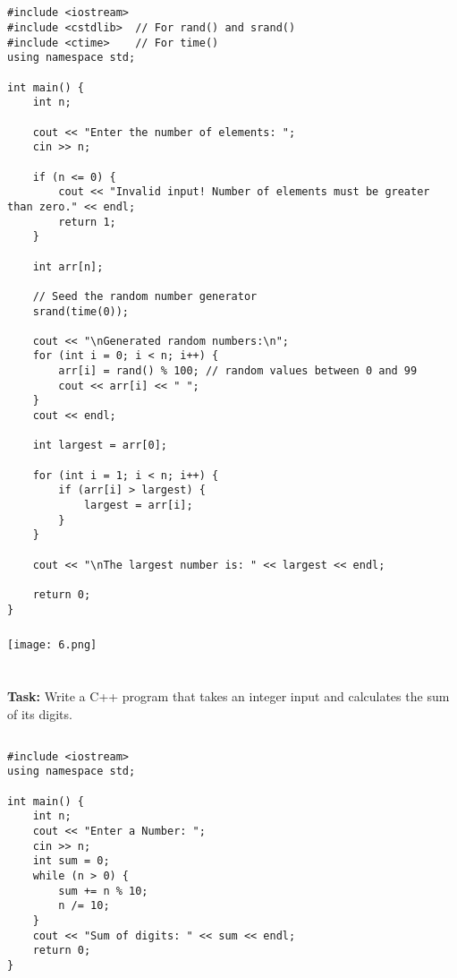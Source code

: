 \documentclass[12pt,a4paper]{article}
\begin{document}
\subsection{}
\begin{lstlisting}
#include <iostream>
#include <cstdlib>  // For rand() and srand()
#include <ctime>    // For time()
using namespace std;

int main() {
    int n;

    cout << "Enter the number of elements: ";
    cin >> n;

    if (n <= 0) {
        cout << "Invalid input! Number of elements must be greater than zero." << endl;
        return 1;
    }

    int arr[n];

    // Seed the random number generator
    srand(time(0));

    cout << "\nGenerated random numbers:\n";
    for (int i = 0; i < n; i++) {
        arr[i] = rand() % 100; // random values between 0 and 99
        cout << arr[i] << " ";
    }
    cout << endl;

    int largest = arr[0];

    for (int i = 1; i < n; i++) {
        if (arr[i] > largest) {
            largest = arr[i];
        }
    }

    cout << "\nThe largest number is: " << largest << endl;

    return 0;
}

\end{lstlisting}

\subsubsection{}
\begin{center}
    \texttt{[image: 6.png]}
\end{center}


\section{}
\textbf{Task:} Write a C++ program that takes an integer input and calculates the sum of its digits.

\subsection{}
\begin{lstlisting}
#include <iostream>
using namespace std;

int main() {
    int n;
    cout << "Enter a Number: ";
    cin >> n;
    int sum = 0;
    while (n > 0) {
        sum += n % 10;
        n /= 10;
    }
    cout << "Sum of digits: " << sum << endl;
    return 0;
}
\end{lstlisting}
\end{document}
